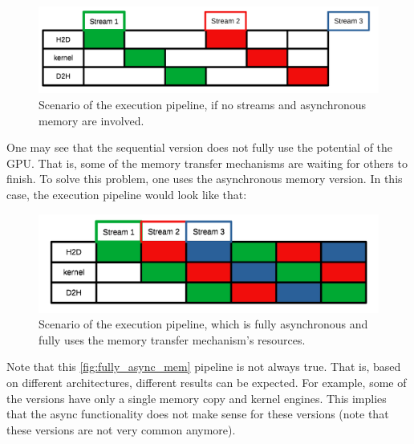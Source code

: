 \begin{figure}
  \centering 
  \includegraphics[scale=0.15]{pngs/asyncmem-page1.png}
  \caption{Scenario of the execution pipeline, if no streams and asynchronous memory are involved.}
\end{figure}

One may see that the sequential version does not fully use the potential of the GPU. That is, some of the memory 
transfer mechanisms are waiting for others to finish. To solve this problem, one uses the asynchronous memory version.
In this case, the execution pipeline would look like that:

\begin{figure}
  \centering 
  \includegraphics[scale=0.15]{pngs/asyncmem-page2.png}
  \caption{Scenario of the execution pipeline, which is fully asynchronous and fully uses the memory transfer mechanism's resources.}
  \label{fig:fully_async_mem}
\end{figure}

Note that this \autoref{fig:fully_async_mem} pipeline is not always true. That is, based on different architectures, 
different results can be expected. For example, some of the versions have only a single memory copy and kernel engines. 
This implies that the async functionality does not make sense for these versions (note that these versions are not very common anymore).

